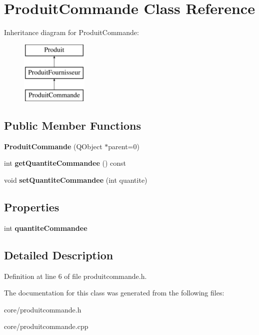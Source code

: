 \hypertarget{class_produit_commande}{
\section{ProduitCommande Class Reference}
\label{class_produit_commande}
}
Inheritance diagram for ProduitCommande:\begin{figure}[H]
\begin{center}
\leavevmode
\includegraphics[height=3.000000cm]{class_produit_commande}
\end{center}
\end{figure}
\subsection*{Public Member Functions}
\begin{DoxyCompactItemize}
\item 
\hypertarget{class_produit_commande_a3551c24e7d3a8b0ead146187b87ea919}{
{\bfseries ProduitCommande} (QObject $\ast$parent=0)}
\label{class_produit_commande_a3551c24e7d3a8b0ead146187b87ea919}

\item 
\hypertarget{class_produit_commande_a2e22727c78c05682742d03e3793a6f77}{
int {\bfseries getQuantiteCommandee} () const }
\label{class_produit_commande_a2e22727c78c05682742d03e3793a6f77}

\item 
\hypertarget{class_produit_commande_a8965e5d3ed457053a99db8cc02f0cd86}{
void {\bfseries setQuantiteCommandee} (int quantite)}
\label{class_produit_commande_a8965e5d3ed457053a99db8cc02f0cd86}

\end{DoxyCompactItemize}
\subsection*{Properties}
\begin{DoxyCompactItemize}
\item 
\hypertarget{class_produit_commande_aa27749b29a2c70785327ac25d4a34343}{
int {\bfseries quantiteCommandee}}
\label{class_produit_commande_aa27749b29a2c70785327ac25d4a34343}

\end{DoxyCompactItemize}


\subsection{Detailed Description}


Definition at line 6 of file produitcommande.h.



The documentation for this class was generated from the following files:\begin{DoxyCompactItemize}
\item 
core/produitcommande.h\item 
core/produitcommande.cpp\end{DoxyCompactItemize}
